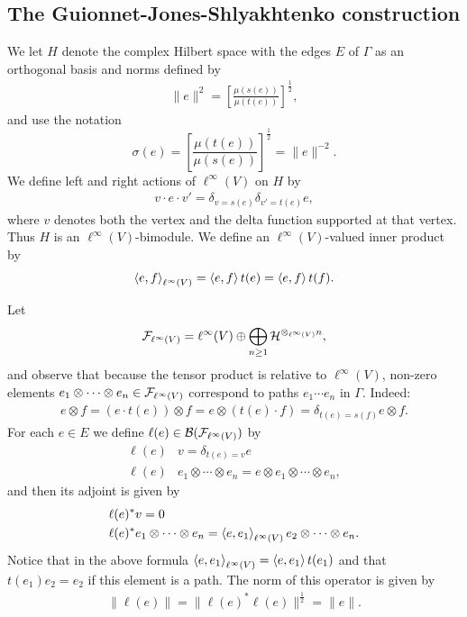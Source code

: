 
\subsection{The Guionnet-Jones-Shlyakhtenko construction}\label{GJS_construction}
We let $H$ denote the complex Hilbert space with the edges $E$ of $\Gamma$ as an orthogonal basis and norms defined by
\begin{align*}
\|e\|^2=\left[\frac{\mu(s(e))}{\mu(t(e))}\right]^\frac{1}{2},
\end{align*}
and use the notation
\begin{equation*}
\sigma(e)=\left[\frac{\mu(t(e))}{\mu(s(e))}\right]^{\frac{1}{2}} = \|e\|^{-2}.
\end{equation*}
We define left and right actions of $\ell^\infty(V)$ on $H$ by
\begin{align*}
v\cdot e\cdot v'= \delta_{v=s(e)}\delta_{v'=t(e)} e,
\end{align*}
where $v$ denotes both the vertex and the delta function supported at that vertex. Thus $H$ is an $\ell^\infty(V)$-bimodule. We define an $\ell^\infty(V)$-valued inner product by
\begin{align*}
\left\langle e,f\right\rangle_{\ell^\infty(V)} = \left\langle e,f\right\rangle t(e) = \left\langle e,f\right\rangle t(f).
\end{align*}

Let
	\begin{align*}
		\mathcal{F}_{\ell^\infty(V)}=\ell^\infty(V)\oplus \bigoplus_{n\geq 1} \mathcal H^{\otimes_{\ell^\infty(V)} n},
	\end{align*}
and observe that because the tensor product is relative to $\ell^\infty(V)$, non-zero elements $e_1\otimes\cdots\otimes e_n\in\mathcal{F}_{\ell^\infty(V)}$ correspond to paths $e_1\cdots e_n$ in $\Gamma$. Indeed:
\begin{align*}
e\otimes f= (e\cdot t(e))\otimes f = e\otimes (t(e)\cdot f) = \delta_{t(e)=s(f)} e\otimes f.
\end{align*}
For each $e\in E$ we define $\ell(e)\in \mathcal{B}(\mathcal{F}_{\ell^\infty(V)})$ by
\begin{align*}
\ell(e)& v = \delta_{t(e)=v} e\\
\ell(e)& e_1\otimes\cdots \otimes e_n= e\otimes e_1\otimes \cdots \otimes e_n,
\end{align*}
and then its adjoint is given by
\begin{align*}
\ell(e)^*& v= 0\\
\ell(e)^*& e_1\otimes \cdots \otimes e_n = \left\langle e,e_1\right\rangle_{\ell^\infty(V)} e_2\otimes\cdots \otimes e_n.
\end{align*}
Notice that in the above formula $\left\langle e,e_1\right\rangle_{\ell^\infty(V)} = \left\langle e,e_1\right\rangle t(e_1)$ and that $t(e_1) e_2=e_2$ if this element is a path. The norm of this operator is given by
\begin{align*}
\| \ell(e)\| = \|\ell(e)^*\ell(e)\|^\frac{1}{2}= \|e\|.
\end{align*}

